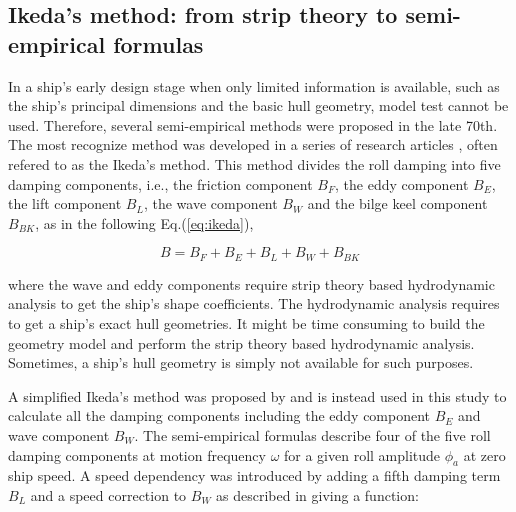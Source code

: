 
\subsection{Ikeda's method: from strip theory to semi-empirical formulas}
\label{se:semi-empirical methods}
In a ship's early design stage when only limited information is available, such as the ship's principal dimensions and the basic hull geometry, model test cannot be used. Therefore, several semi-empirical methods were proposed in the late 70th. The most recognize method was developed in a series of research articles \parencite{ikeda_roll_1978,ikeda_eddy_1978,ikeda_roll_1979,ikeda_components_1978,ikeda_velocity_1979}, often refered to as the Ikeda's method. This method divides the roll damping into five damping components, i.e., the friction component $B_F$, the eddy component $B_E$, the lift component $B_L$, the wave component $B_W$ and the bilge keel component $B_{BK}$, as in the following Eq.(\ref{eq:ikeda}), 

\begin{equation} \label{eq:ikeda}
B = B_F + B_E + B_L + B_W + B_{BK}
\end{equation}

where the wave and eddy components require strip theory based hydrodynamic analysis to get the ship's shape coefficients. The hydrodynamic analysis requires to get a ship's exact hull geometries. It might be time consuming to build the geometry model and perform the strip theory based hydrodynamic analysis. Sometimes, a ship's hull geometry is simply not available for such purposes. 

A simplified Ikeda's method was proposed by \parencite{kawahara_simple_2011} and is instead used in this study to calculate all the damping components including the eddy component $B_E$ and wave component $B_W$. The semi-empirical formulas describe four of the five roll damping components at motion frequency $\omega$ for a given roll amplitude $\phi_a$ at zero ship speed. A speed dependency was introduced by adding a fifth damping term $B_L$ and a speed correction to $B_W$ as described in \parencite{ikeda_velocity_1979} giving a function: 



